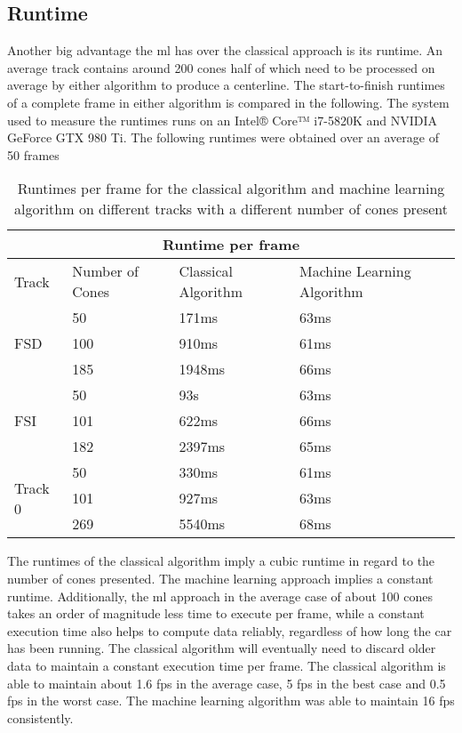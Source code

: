 \subsection{Runtime}
Another big advantage the \ac{ml} has over the classical approach is its runtime. An average track contains around 200 cones half of which need to be processed on average by either algorithm to produce a centerline. The start-to-finish runtimes of a complete frame in either algorithm is compared in the following. The system used to measure the runtimes runs on an Intel® Core™ i7-5820K and NVIDIA GeForce GTX 980 Ti. The following runtimes were obtained over an average of 50 frames

\begin{table}[h!]
\centering
\begin{tabular}{ |p{1.5cm} p{3cm}||p{4cm}|p{5cm}|  }
    \hline
    \multicolumn{4}{|c|}{Runtime per frame} \\
    \hline
    Track  & Number of Cones  & Classical Algorithm & Machine Learning Algorithm\\
    \hline
    \hline

    \multirow{3}{*}{FSD} & 50  & 171ms & 63ms \\
                         & 100 & 910ms & 61ms\\
                         & 185 & 1948ms & 66ms\\ 
                         \hline
    \multirow{3}{*}{FSI} & 50  & 93s & 63ms\\
                         & 101 & 622ms & 66ms\\
                         & 182 & 2397ms & 65ms\\ 
                         \hline
    \multirow{3}{*}{Track 0} & 50  & 330ms & 61ms\\
                             & 101 & 927ms & 63ms\\
                             & 269 & 5540ms & 68ms\\ 
                             \hline
   \end{tabular}
\caption{Runtimes per frame for the classical algorithm and machine learning algorithm on different tracks with a different number of cones present}
\label{table:2}
\end{table}

The runtimes of the classical algorithm imply a cubic runtime in regard to the number of cones presented. The machine learning approach implies a constant runtime. Additionally, the \ac{ml} approach in the average case of about 100 cones takes an order of magnitude less time to execute per frame, while a constant execution time also helps to compute data reliably, regardless of how long the car has been running. The classical algorithm will eventually need to discard older data to maintain a constant execution time per frame. The classical algorithm is able to maintain about 1.6 \ac{fps} in the average case, 5 \ac{fps} in the best case and 0.5 \ac{fps} in the worst case. The machine learning algorithm was able to maintain 16 \ac{fps} consistently. 